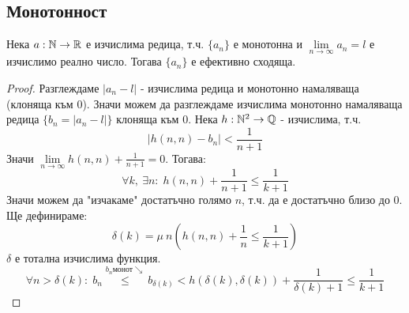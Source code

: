 \subsection{Монотонност}
\begin{proposition}[Монотонност]\label{prop:computable-monot-seq}
    Нека $a: {\mathbb{N}} \to {\mathbb{R}}$ е изчислима редица, т.ч. $\{a_n\}$ е монотонна и  $\lim\limits_{n\to\infty} a_n = l$ е изчислимо реално число. Тогава $\{a_n\}$ е ефективно сходяща.
\end{proposition}
\begin{proof}
    Разглеждаме $|a_n - l|$ - изчислима редица и монотонно намаляваща (клоняща към 0). Значи можем да разглеждаме изчислима монотонно намаляваща редица $\{b_n = |a_n - l|\}$ клоняща към 0. Нека $h: {\mathbb{N}}^2 \to {\mathbb{Q}}$ - изчислима, т.ч.
    \begin{equation}
        |h(n,n) - b_n| < \frac{1}{n+1} 
    \end{equation}
    Значи $\lim\limits_{n\to\infty}h(n,n) + \frac{1}{n+1} = 0$. Тогава:
    \begin{equation}
        \forall k,\ \exists n:\; h(n,n) + \frac{1}{n+1} \leq \frac{1}{k+1}
    \end{equation}
    Значи можем да "изчакаме" достатъчно голямо $n$, т.ч. да е достатъчно близо до 0. Ще дефинираме:
    \begin{equation}
        \delta(k) = \mu\ n \left( h(n,n) + \frac{1}{n} \leq \frac{1}{k+1} \right)
    \end{equation}
    $\delta$ е тотална изчислима функция.
    \begin{equation}
        \forall n > \delta(k):\; b_n \overset{b_n \text{монот}\searrow}{\leq} b_{\delta(k)} < h(\delta(k), \delta(k)) + \frac{1}{\delta(k) + 1} \leq \frac{1}{k+1}
    \end{equation}
\end{proof}
